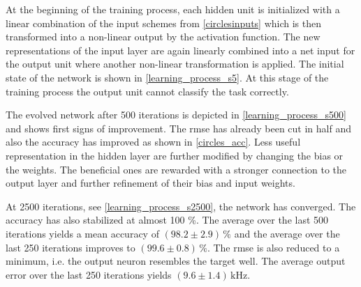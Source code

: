 At the beginning of the training process, each hidden unit is initialized with a linear combination of the input schemes from \cref{circlesinputs} which is then transformed into a non-linear output by the activation function. The new representations of the input layer are again linearly combined into a net input for the output unit where another non-linear transformation is applied. The initial state of the network is shown in \cref{learning_process_s5}. At this stage of the training process the output unit cannot classify the task correctly. 

%	

The evolved network after 500 iterations is depicted in \cref{learning_process_s500} and shows first signs of improvement. The \gls{rmse} has already been cut in half and also the accuracy has improved as shown in \cref{circles_acc}. Less useful representation in the hidden layer are further modified by changing the bias or the weights. The beneficial ones are rewarded with a stronger connection to the output layer and further refinement of their bias and input weights.

At 2500 iterations, see \cref{learning_process_s2500}, the network has converged. The accuracy has also stabilized at almost 100 \%. The average over the last 500 iterations yields a mean accuracy of $(98.2 \pm 2.9)\,\%$ and the average over the last 250 iterations improves to  $(99.6 \pm 0.8)\,\%$. The \gls{rmse} is also reduced to a minimum, i.e. the output neuron resembles the target well. The average output error over the last 250 iterations yields $(9.6 \pm 1.4)\,\si{\kilo \Hz}$.


%    
